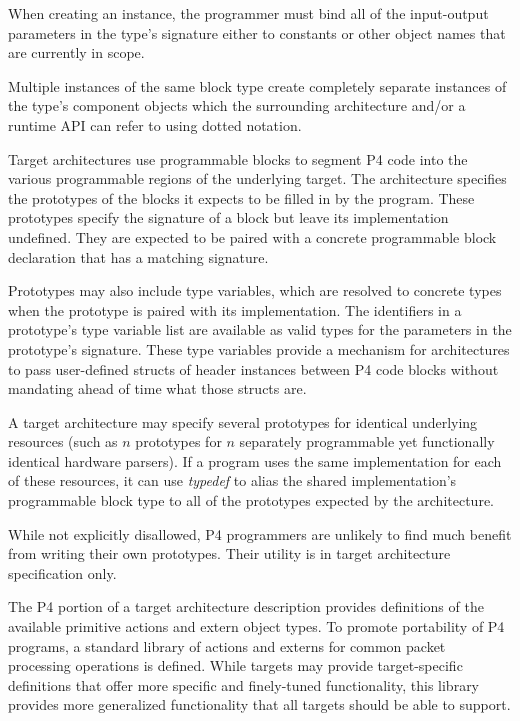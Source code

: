 \documentclass[12pt]{article}
\begin{document}
When creating an instance, the programmer must bind all of the input-output
parameters in the type's signature either to constants or other object names
that are currently in scope. 

Multiple instances of the same block type create completely separate
instances of the type's component objects which the surrounding architecture
and/or a runtime API can refer to using dotted notation.


Target architectures use programmable blocks to segment P4 code into the
various programmable regions of the underlying target.  The architecture
specifies the prototypes of the blocks it expects to be filled in by the
program.  These prototypes specify the signature of a block but leave its
implementation undefined.  They are expected to be paired with a concrete
programmable block declaration that has a matching signature.

Prototypes may also include type variables, which are resolved to
concrete types when the prototype is paired with its implementation.  The
identifiers in a prototype's type variable list are available as valid types
for the parameters in the prototype's signature. These type variables provide
a mechanism for architectures to pass user-defined structs of header instances
between P4 code blocks without mandating ahead of time what those structs are.

A target architecture may specify several prototypes for identical underlying
resources (such as $n$ prototypes for $n$ separately programmable yet
functionally identical hardware parsers). If a program uses the same
implementation for each of these resources, it can use \textit{typedef} to
alias the shared implementation's programmable block type to all of the
prototypes expected by the architecture.

While not explicitly disallowed, P4 programmers are unlikely to find much
benefit from writing their own prototypes.  Their utility is in target
architecture specification only.



The P4 portion of a target architecture description provides
definitions of the available primitive actions and extern object types.
To promote portability of P4 programs, a standard library of actions and externs
for common packet processing operations is defined.  While targets may provide
target-specific definitions that offer more specific and finely-tuned
functionality, this library provides more generalized functionality that
all targets should be able to support.
\end{document}
